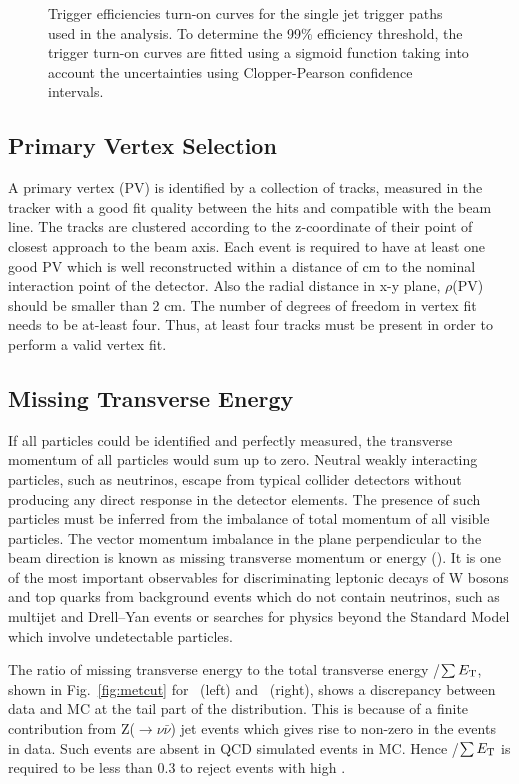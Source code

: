 \begin{figure}[!htbp]
\begin{center}
 \caption{Trigger efficiencies turn-on curves for the single jet trigger paths used in the analysis. To determine the 99\% efficiency threshold, the trigger turn-on curves are fitted using a sigmoid function taking into account the uncertainties using Clopper-Pearson confidence intervals.}
 \label{fig:trig_eff}
 \end{center}
\end{figure}

\subsection{Primary Vertex Selection}
A primary vertex (PV) is identified by a collection of tracks, measured in the tracker with a good fit quality between the hits and compatible with the beam line. The tracks are clustered according to the z-coordinate of their point of closest approach to the beam axis. Each event is required to have at least one good PV which is well reconstructed within a distance of  cm to the nominal interaction point of the detector. Also the radial distance in x-y plane, $\rho$(PV) should be smaller than 2 cm. The number of degrees of freedom in vertex fit needs to be at-least four. Thus, at least four tracks must be present in order to perform a valid vertex fit.

\subsection{Missing Transverse Energy}
If all particles could be identified and perfectly measured, the transverse momentum of all particles would sum up to zero. Neutral weakly interacting particles, such as neutrinos, escape from typical collider detectors without producing any direct response in the detector elements. The presence of such particles must be inferred from the imbalance of total momentum of all visible particles. The vector momentum imbalance in the plane perpendicular to the beam direction is known as missing transverse momentum or energy (\ETmiss). It is one of the most important observables for discriminating leptonic decays of W bosons and top quarks from background events which do not contain neutrinos, such  as multijet and Drell–Yan events or searches for physics beyond the Standard Model which involve undetectable particles.

The ratio of missing transverse energy to the total transverse energy \ETmiss/$\sum E_{\mathrm{T}}$, shown in Fig.~\ref{fig:metcut} for \njt~(left) and \njth~(right), shows a discrepancy between data and MC at the tail part of the distribution. This is because of a  finite contribution from Z($\rightarrow \nu \bar{\nu}$) \plus jet events which gives rise to non-zero \ET in the events in data. Such events are absent in QCD simulated events in MC. Hence \ETmiss/$\sum E_{\mathrm{T}}$ is required to be less than 0.3 to reject events with high \ETmiss.

